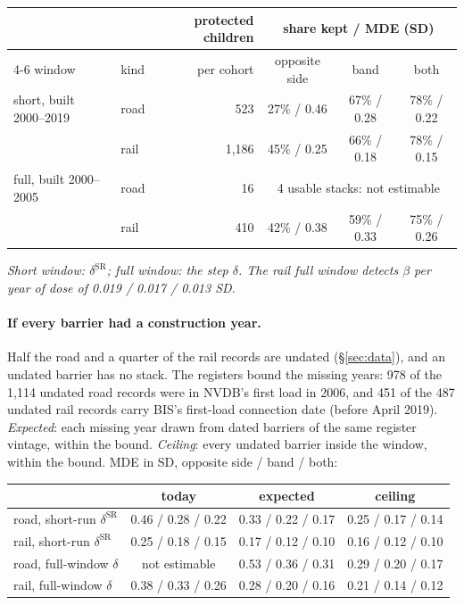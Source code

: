 \documentclass[11pt]{article}
\begin{document}
\begin{center}
\footnotesize
\begin{tabular}{@{}llrccc@{}}
\toprule
& & protected children & \multicolumn{3}{c}{share kept / MDE (SD)} \\
\cmidrule(l){4-6}
window & kind & per cohort & opposite side & band & both \\
\midrule
short, built 2000--2019 & road & 523 & 27\% / 0.46 & 67\% / 0.28 & 78\% / 0.22 \\
                        & rail & 1,186 & 45\% / 0.25 & 66\% / 0.18 & 78\% / 0.15 \\
full, built 2000--2005  & road & 16 & \multicolumn{3}{c}{4 usable stacks: not estimable} \\
                        & rail & 410 & 42\% / 0.38 & 59\% / 0.33 & 75\% / 0.26 \\
\bottomrule
\end{tabular}

\smallskip
\emph{Short window: \(\delta^{\text{SR}}\); full window: the step \(\delta\). The rail full window
detects \(\beta\) per year of dose of 0.019 / 0.017 / 0.013 SD.}
\end{center}

\paragraph{If every barrier had a construction year.} Half the road and a quarter of the rail
records are undated (\S\ref{sec:data}), and an undated barrier has no stack. The registers bound
the missing years: 978 of the 1,114 undated road records were in NVDB's first load in 2006, and
451 of the 487 undated rail records carry BIS's first-load connection date (before April 2019).
\emph{Expected}: each missing year drawn from dated barriers of the same register vintage, within
the bound. \emph{Ceiling}: every undated barrier inside the window, within the bound. MDE in SD,
opposite side / band / both:

\begin{center}
\footnotesize
\begin{tabular}{@{}lccc@{}}
\toprule
& today & expected & ceiling \\
\midrule
road, short-run \(\delta^{\text{SR}}\) & 0.46 / 0.28 / 0.22 & 0.33 / 0.22 / 0.17 & 0.25 / 0.17 / 0.14 \\
rail, short-run \(\delta^{\text{SR}}\) & 0.25 / 0.18 / 0.15 & 0.17 / 0.12 / 0.10 & 0.16 / 0.12 / 0.10 \\
road, full-window \(\delta\) & not estimable & 0.53 / 0.36 / 0.31 & 0.29 / 0.20 / 0.17 \\
rail, full-window \(\delta\) & 0.38 / 0.33 / 0.26 & 0.28 / 0.20 / 0.16 & 0.21 / 0.14 / 0.12 \\
\bottomrule
\end{tabular}
\end{center}
\end{document}
